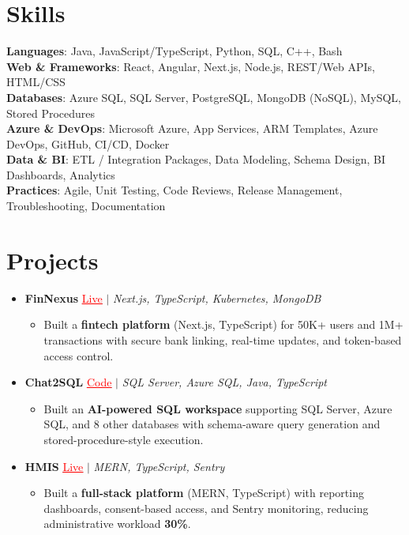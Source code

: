 \documentclass[letterpaper,10pt]{article}
\newcommand{\resumeItem}[1]{\item\small{{#1 \vspace{-2pt}}}}
\newcommand{\resumeProjectHeading}[1]{\item \small #1 \vspace{-2pt}}
\newcommand{\resumeSubHeadingListStart}{\begin{itemize}[leftmargin=0.0in, label={}]}
\newcommand{\resumeSubHeadingListEnd}{\end{itemize}}
\newcommand{\resumeProjItemListStart}{\begin{itemize}[leftmargin=0.15in,label=\textbullet,itemsep=0pt,topsep=0pt,parsep=0pt,partopsep=0pt]}
\newcommand{\resumeProjItemListEnd}{\end{itemize}\vspace{-4pt}}
\begin{document}
\section{Skills}
\begin{itemize}[leftmargin=0.15in, label={}]
\small{\item{
\textbf{Languages}: Java, JavaScript/TypeScript, Python, SQL, C++, Bash \\
\textbf{Web \& Frameworks}: React, Angular, Next.js, Node.js, REST/Web APIs, HTML/CSS \\
\textbf{Databases}: Azure SQL, SQL Server, PostgreSQL, MongoDB (NoSQL), MySQL, Stored Procedures \\
\textbf{Azure \& DevOps}: Microsoft Azure, App Services, ARM Templates, Azure DevOps, GitHub, CI/CD, Docker \\
\textbf{Data \& BI}: ETL / Integration Packages, Data Modeling, Schema Design, BI Dashboards, Analytics \\
\textbf{Practices}: Agile, Unit Testing, Code Reviews, Release Management, Troubleshooting, Documentation
}}
\end{itemize}
\vspace{-6pt}
\section{Projects}
\resumeSubHeadingListStart
\vspace{-2pt}
\resumeProjectHeading{\textbf{FinNexus} {\href{https://fin-nexus.vercel.app/}{\textcolor{red}{\underline{Live}}}} $|$ \emph{Next.js, TypeScript, Kubernetes, MongoDB}}
\resumeProjItemListStart
\resumeItem{Built a \textbf{fintech platform} (Next.js, TypeScript) for 50K+ users and 1M+ transactions with secure bank linking, real-time updates, and token-based access control.}
\resumeProjItemListEnd
\vspace{3pt}
\resumeProjectHeading{\textbf{Chat2SQL} {\href{https://github.com/SAHAJ-BHADJA/Chat2SQL}{\textcolor{red}{\underline{Code}}}} $|$ \emph{SQL Server, Azure SQL, Java, TypeScript}}
\resumeProjItemListStart
\resumeItem{Built an \textbf{AI-powered SQL workspace} supporting SQL Server, Azure SQL, and 8 other databases with schema-aware query generation and stored-procedure-style execution.}
\resumeProjItemListEnd
\vspace{3pt}
\resumeProjectHeading{\textbf{HMIS} {\href{https://hims-rouge.vercel.app/}{\textcolor{red}{\underline{Live}}}} $|$ \emph{MERN, TypeScript, Sentry}}
\resumeProjItemListStart
\resumeItem{Built a \textbf{full-stack platform} (MERN, TypeScript) with reporting dashboards, consent-based access, and Sentry monitoring, reducing administrative workload \textbf{30\%}.}
\resumeProjItemListEnd
\resumeSubHeadingListEnd
\end{document}
